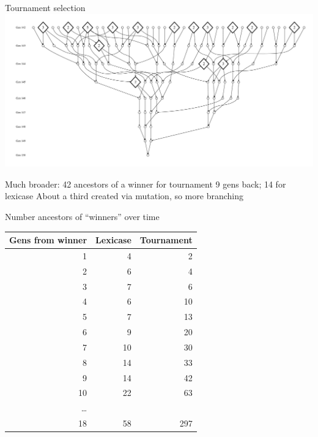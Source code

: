 \documentclass{beamer}
\begin{document}
\begin{frame}{Tournament selection}
	\includegraphics[width=\linewidth]{Figures/ancestors_of_winner_rswn_tourney_run74_9gens}
	\begin{overprint}
		Much broader: 42 ancestors of a winner for tournament 9 gens back; 14 for lexicase
		\onslide<2>About a third created via mutation, so more branching
	\end{overprint}
\end{frame}

\begin{frame}{Number ancestors of ``winners'' over time}
		\begin{center}
			\begin{tabular}{rrr}
				Gens from winner & Lexicase & Tournament \\
				\hline\noalign{\smallskip}                
                1 & 4 & 2 \\
                2 & 6 & 4 \\
                3 & 7 & 6 \\
                4 & 6 & 10 \\
                5 & 7 & 13 \\
                6 & 9 & 20 \\
                7 & 10 & 30 \\
                8 & 14 & 33 \\
                9 & 14 & 42 \\
                10 & 22 & 63 \\ 
                \ldots \\ 
                18 & 58 & 297 \\
			\end{tabular}
		\end{center}
\end{frame}
\end{document}
